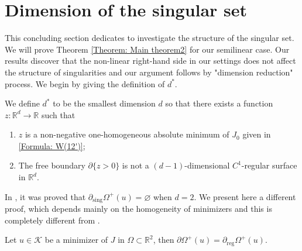\documentclass[11pt,reqno]{amsart}
\begin{document}
\section{Dimension of the singular set}
This concluding section dedicates to investigate the structure of the singular set. We will prove Theorem \ref{Theorem: Main theorem2} for our semilinear case. Our results discover that the non-linear right-hand side in our settings does not affect the structure of singularities and our argument follows by "dimension reduction" process. We begin by giving the definition of $d^{*}$.
\begin{definition}\label{Definition: d*}
	We define $d^{*}$ to be the smallest dimension $d$ so that there exists a function $z\colon\mathbb{R}^{d}\to\mathbb{R}$ such that
	\begin{enumerate}
		\item $z$ is a non-negative one-homogeneous absolute minimum of $J_{0}$ given in \eqref{Formula: W(12')};
		\item The free boundary $\partial\{z>0\}$ is not a $(d-1)$-dimensional $C^{1}$-regular surface in $\mathbb{R}^{d}$.
	\end{enumerate}
\end{definition} 
In \cite{CD2020}, it was proved that $\partial_{\mathrm{sing}}\varOmega^{+}(u)=\varnothing$ when $d=2$. We present here a different proof, which depends mainly on the homogeneity of minimizers and this is completely different from \cite{CD2020}. 
\begin{proposition}\label{Proposition: d*geq3}
	Let $u\in\mathcal{K}$ be a minimizer of $J$ in $\Omega\subset\mathbb{R}^{2}$, then $\partial\varOmega^{+}(u)=\partial_{\mathrm{reg}}\varOmega^{+}(u)$.
\end{proposition}
\end{document}
